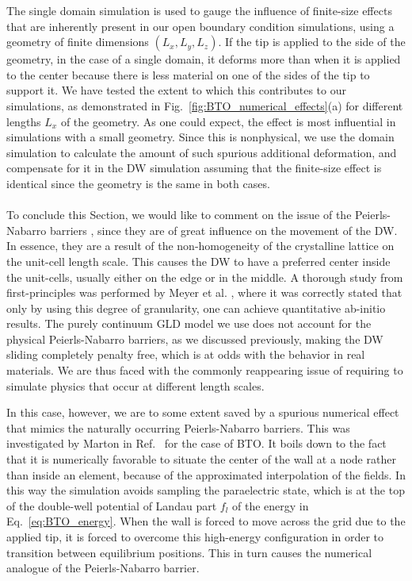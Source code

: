 The single domain simulation is used to gauge the influence of finite-size effects that are inherently present in our open boundary condition simulations, using a geometry of finite dimensions $(L_x, L_y, L_z)$.
If the tip is applied to the side of the geometry, in the case of a single domain, it deforms more than when it is applied to the center because there is less material on one of the sides of the tip to support it.
We have tested the extent to which this contributes to our simulations, as demonstrated in Fig.~\ref{fig:BTO_numerical_effects}(a) for different lengths $L_x$ of the geometry. As one could expect, the effect is most influential in simulations with a small geometry.
Since this is nonphysical, we use the domain simulation to calculate the amount of such spurious additional deformation, and compensate for it in the DW simulation assuming that the finite-size effect is identical since the geometry is the same in both cases.
\\\\
To conclude this Section, we would like to comment on the issue of the Peierls-Nabarro barriers \cite{Peierls1940,Nabarro1947}, since they are of great influence on the movement of the DW.
In essence, they are a result of the non-homogeneity of the crystalline lattice on the unit-cell length scale.
This causes the DW to have a preferred center inside the unit-cells, usually either on the edge or in the middle.
A thorough study from first-principles was performed by Meyer et al. \cite{Meyer2002}, where it was correctly stated that only by using this degree of granularity, one can achieve quantitative ab-initio results.
The purely continuum GLD model we use does not account for the physical Peierls-Nabarro barriers, as we discussed previously, making the DW sliding completely penalty free, which is at odds with the behavior in real materials.
We are thus faced with the commonly reappearing issue of requiring to simulate physics that occur at different length scales.

In this case, however, we are to some extent saved by a spurious numerical effect that mimics the naturally occurring Peierls-Nabarro barriers.
This was investigated by Marton in Ref.~\cite{Marton2018} for the case of BTO.
It boils down to the fact that it is numerically favorable to situate the center of the wall at a node rather than inside an element, because of the approximated interpolation of the fields.
In this way the simulation avoids sampling the paraelectric state, which is at the top of the double-well potential of Landau part $f_l$ of the energy in Eq.~\eqref{eq:BTO_energy}.
When the wall is forced to move across the grid due to the applied tip, it is forced to overcome this high-energy configuration in order to transition between equilibrium positions.
This in turn causes the numerical analogue of the Peierls-Nabarro barrier.

